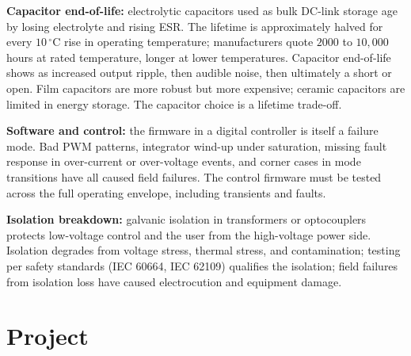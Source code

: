 \textbf{Capacitor end-of-life:} electrolytic capacitors used as bulk DC-link storage age by losing electrolyte and rising ESR. The lifetime is approximately halved for every $10\,^\circ\text{C}$ rise in operating temperature; manufacturers quote $2000$ to $10{,}000$ hours at rated temperature, longer at lower temperatures. Capacitor end-of-life shows as increased output ripple, then audible noise, then ultimately a short or open. Film capacitors are more robust but more expensive; ceramic capacitors are limited in energy storage. The capacitor choice is a lifetime trade-off.

\textbf{Software and control:} the firmware in a digital controller is itself a failure mode. Bad PWM patterns, integrator wind-up under saturation, missing fault response in over-current or over-voltage events, and corner cases in mode transitions have all caused field failures. The control firmware must be tested across the full operating envelope, including transients and faults.

\textbf{Isolation breakdown:} galvanic isolation in transformers or optocouplers protects low-voltage control and the user from the high-voltage power side. Isolation degrades from voltage stress, thermal stress, and contamination; testing per safety standards (IEC 60664, IEC 62109) qualifies the isolation; field failures from isolation loss have caused electrocution and equipment damage.

\section{Project}

